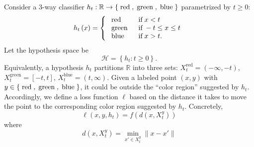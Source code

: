 \documentclass{article}
\def\H{\mathcal H}
\def\R{\mathbb R}
\begin{document}
\begin{figure}[H] \centering {} \label{fig:1dam}
\end{figure}
 Consider a 3-way classifier $h_t: \R \to  \left\{\text{\;red\;}, \text{\;green\;}, \text{\;blue\;}\right\} $ parametrized by $t\ge 0$:
 \begin{equation}
 h_{t}\left(x\right) =\left\{ \begin{array}{ll}
 \text{\;red\;}& \text{\;if\;} x < t  \\
 \text{\;green\;}& \text{\;if\;} -t \leq  x \leq  t \\
 \text{\;blue\;}& \text{\;if\;} x  > t. \\
 \end{array}\right. 
 \end{equation}
 Let the hypothesis space be
 \begin{equation}
 \H = \left\{ h_t : t \geq  0\right\}.
 \end{equation}
 Equivalently, a hypothesis $h_t$ partitions $\R$ into three sets: 
 $X^\text{red}_t = (-\infty, -t)$,
 $X^\text{green}_t = [-t, t]$,
 $X^\text{blue}_t = (t, \infty)$.
 Given a labeled point $(x,y)$ with  $y \in \left\{\text{\;red\;}, \text{\;green\;}, \text{\;blue\;}\right\}$, it could be outside the ``color region'' suggested by $h_t$. 
 Accordingly, we define a loss function $\ell$ based on the distance it takes to move the point to the corresponding color region suggested by $h_t$.
 Concretely,
 \begin{equation}
 \ell\left(x, y, h_t\right) = f(d(x, X^y_t))
 \end{equation}
 where 
 \begin{equation}
 d(x, X^y_t) = \min_{x' \in X^y_t} \|x-x'\|
 \end{equation}
\end{document}
